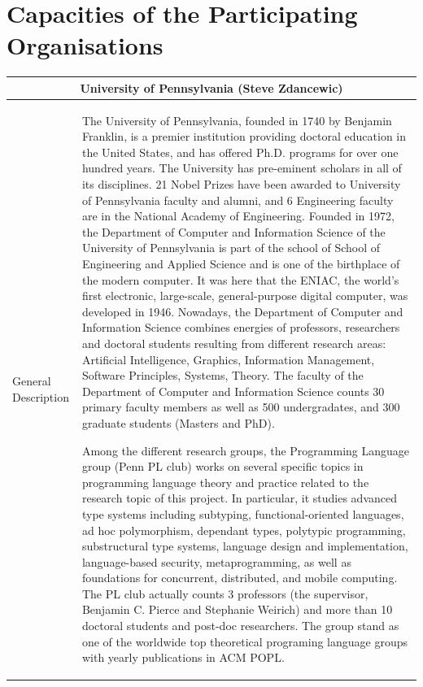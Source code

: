 \documentclass{article}[11pt]
\begin{document}
\newpage

\section{Capacities of the Participating Organisations}

{\footnotesize
  \begin{tabular}{| l | l |}
    \hline
    \multicolumn{2}{|c|}{University of Pennsylvania (Steve Zdancewic)}\\
    \hline
    \parbox[c]{4cm}{General Description} & 
    \parbox[c]{14cm}{The University of Pennsylvania, founded in 1740 by Benjamin Franklin, is a premier
      institution providing doctoral education in the United States, and has offered Ph.D. programs for over one hundred
      years. The University has pre-eminent scholars in all of its disciplines. 21 Nobel Prizes have been awarded to University
      of Pennsylvania faculty and alumni, and 6 Engineering faculty are in the National Academy of Engineering.
      Founded in 1972, the Department of Computer and Information Science of the University of Pennsylvania is part
      of the school of School of Engineering and Applied Science and is one of the birthplace of the modern computer. It
      was here that the ENIAC, the world’s first electronic, large-scale, general-purpose digital computer, was developed in
      1946. Nowadays, the Department of Computer and Information Science combines energies of professors, researchers and
      doctoral students resulting from different research areas: Artificial Intelligence, Graphics, Information Management,
      Software Principles, Systems, Theory. The faculty of the Department of Computer and Information Science counts 30
      primary faculty members as well as 500 undergradates, and 300 graduate students (Masters and PhD).

      Among the different research groups, the Programming Language group (Penn PL club)
      works on several specific topics in programming language theory and practice related to the research topic of this
      project. In particular, it studies advanced type systems including subtyping, functional-oriented languages, ad hoc
      polymorphism, dependant types, polytypic programming, substructural type systems, language design and implementation, language-based security, metaprogramming, as well as foundations for concurrent, distributed, and mobile
      computing.
      The PL club actually counts 3 professors (the supervisor, Benjamin C. Pierce and Stephanie Weirich) and more than
      10 doctoral students and post-doc researchers. The group stand as one of the worldwide top theoretical programing
      language groups with yearly publications in ACM POPL.

}
\end{tabular}}
\end{document}
